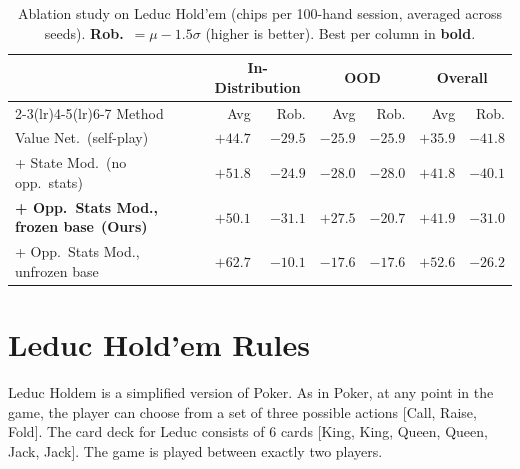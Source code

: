 \documentclass{article}
\begin{document}
\begin{table}[t]
\centering
\caption{Ablation study on Leduc Hold'em (chips per 100-hand session, averaged across seeds).
\textbf{Rob.}~$= \mu - 1.5\sigma$ (higher is better). Best per column in \textbf{bold}.}
\label{tab:ablation}
\setlength{\tabcolsep}{5pt}
\begin{tabular}{l rr rr rr}
\toprule
& \multicolumn{2}{c}{In-Distribution} & \multicolumn{2}{c}{OOD} & \multicolumn{2}{c}{Overall} \\
\cmidrule(lr){2-3}\cmidrule(lr){4-5}\cmidrule(lr){6-7}
Method & Avg & Rob. & Avg & Rob. & Avg & Rob. \\
\midrule
Value Net.\ (self-play) & $+44.7$ & $-29.5$ & $-25.9$ & $-25.9$ & $+35.9$ & $-41.8$ \\
\quad + State Mod.\ (no opp.\ stats) & $+51.8$ & $-24.9$ & $-28.0$ & $-28.0$ & $+41.8$ & $-40.1$ \\
\textbf{\quad + Opp.\ Stats Mod., frozen base}~\textbf{(Ours)} & $+50.1$ & $-31.1$ & $\mathbf{+27.5}$ & $-20.7$ & $+41.9$ & $-31.0$ \\
\quad + Opp.\ Stats Mod., unfrozen base & $\mathbf{+62.7}$ & $\mathbf{-10.1}$ & $-17.6$ & $\mathbf{-17.6}$ & $\mathbf{+52.6}$ & $\mathbf{-26.2}$ \\
\bottomrule
\end{tabular}
\end{table}




\appendix

\section{Leduc Hold'em Rules}
\label{app:rules}

Leduc Holdem is a simplified version of Poker. As in Poker, at any point in the game, the player can choose from a set of three possible actions [Call, Raise, Fold]. The card deck for Leduc consists of 6 cards [King, King, Queen, Queen, Jack, Jack]. The game is played between exactly two players.
\end{document}
